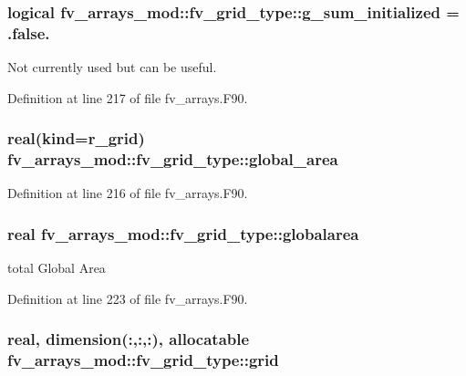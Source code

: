 \subsubsection[{g\-\_\-sum\-\_\-initialized}]{\setlength{\rightskip}{0pt plus 5cm}logical fv\-\_\-arrays\-\_\-mod\-::fv\-\_\-grid\-\_\-type\-::g\-\_\-sum\-\_\-initialized = .false.}\label{structfv__arrays__mod_1_1fv__grid__type_a6b5cae2a38a6cb623370af93220f6c9b}


Not currently used but can be useful. 



Definition at line 217 of file fv\-\_\-arrays.\-F90.

\subsubsection[{global\-\_\-area}]{\setlength{\rightskip}{0pt plus 5cm}real(kind={\bf r\-\_\-grid}) fv\-\_\-arrays\-\_\-mod\-::fv\-\_\-grid\-\_\-type\-::global\-\_\-area}\label{structfv__arrays__mod_1_1fv__grid__type_aee36f5d061433ed3c25b33bd7f2db89e}


Definition at line 216 of file fv\-\_\-arrays.\-F90.

\subsubsection[{globalarea}]{\setlength{\rightskip}{0pt plus 5cm}real fv\-\_\-arrays\-\_\-mod\-::fv\-\_\-grid\-\_\-type\-::globalarea}\label{structfv__arrays__mod_1_1fv__grid__type_a383deb175e4a761c10e8f9d09817146a}


total Global Area 



Definition at line 223 of file fv\-\_\-arrays.\-F90.

\subsubsection[{grid}]{\setlength{\rightskip}{0pt plus 5cm}real, dimension(\-:,\-:,\-:), allocatable fv\-\_\-arrays\-\_\-mod\-::fv\-\_\-grid\-\_\-type\-::grid}\label{structfv__arrays__mod_1_1fv__grid__type_ab4f3c37b71e4dd444556536138e886d5}


